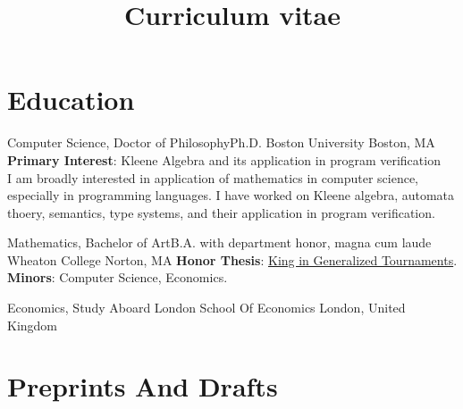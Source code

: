 \documentclass[11pt,roman]{moderncv}        %
\title{Curriculum vitae}
\begin{document}

\makecvtitle{}

\setlength{\parskip}{2.5px}
\linespread{1.3}
\selectfont


\section{Education}

{Computer Science, \iftechnical Doctor of Philosophy\else Ph.D.\fi} {}
{Boston University}
{Boston, MA}
{\textbf{Primary Interest}: Kleene Algebra and its application in program verification\\
I am broadly interested in application of mathematics in computer science,
especially in programming languages.
I have worked on Kleene algebra, automata thoery, semantics, type systems, and their application in program verification.
}  %





{Mathematics, \iftechnical Bachelor of Art\else B.A.\fi} {with department honor, magna cum laude}
{Wheaton College}
{Norton, MA}
{\textbf{Honor Thesis}: \href{http://hdl.handle.net/11040/24570}{King in Generalized Tournaments}.\\
\textbf{Minors}: Computer Science, Economics.
}

{Economics, Study Aboard} {}
{London School Of Economics}
{London, United Kingdom}
{}  %


\section{Preprints And Drafts}
\end{document}
